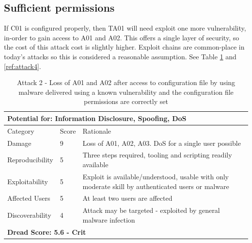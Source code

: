 \documentclass [11pt, proquest] {uwthesis}[2020/02/24]
\begin{document}
\subsection{Sufficient permissions}
If C01 is configured properly, then TA01 will need exploit one more vulnerability, in-order to gain access to A01 and A02. This offers a single layer of security, so the cost of this attack cost is slightly higher. Exploit chains are common-place in today's attacks so this is considered a reasonable assumption.  
See Table \ref{ref:attack2} and \ref{ref:attack4}.
\begin{table}[H]

\begin{tabular}{|m{3cm}|m{1cm}|p{27em} |}
\multicolumn{3}{l}{Potential for: Information Disclosure, Spoofing, DoS}                   \\
\hline
Category & Score & Rationale \\
\hline
Damage          & 9     & Loss of A01, A02, A03. DoS for a single user possible            \\
\hline
Reproducibility & 5     & Three steps required, tooling and scripting readily available    \\
\hline
Exploitability & 5      & Exploit is available/understood, usable with only moderate skill by authenticated users or malware \\
\hline
Affected Users  & 5     & At least two users are affected                      \\
\hline
Discoverability & 4     & Attack may be targeted - exploited by general malware infection \\
\hline
\multicolumn{3}{l}{\textbf{Dread Score: 5.6 - Crit}} 
\end{tabular}
\caption{Attack 2 - Loss of A01 and A02 after access to configuration file by using malware delivered using a known vulnerability and the configuration file permissions are correctly set}
\label{ref:attack2}
\end{table}
\end{document}
